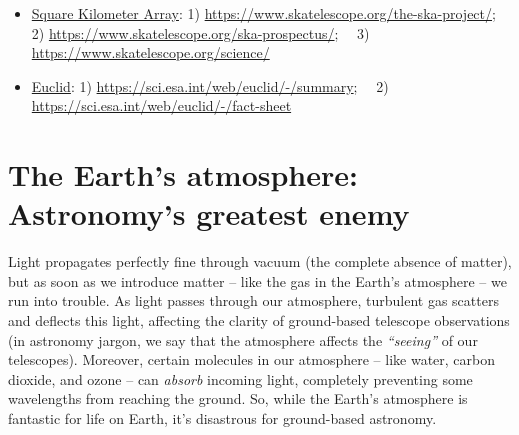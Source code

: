 \documentclass[11pt]{article}
\begin{document}
\begin{enumerate}
\begin{itemize}
        \item \underline{Square Kilometer Array}: 1) \url{https://www.skatelescope.org/the-ska-project/}; \, \, 2) \url{https://www.skatelescope.org/ska-prospectus/}; \, \, 3) \url{https://www.skatelescope.org/science/}
        
        \item \underline{Euclid}: 1) \url{https://sci.esa.int/web/euclid/-/summary}; \, \, 2) \url{https://sci.esa.int/web/euclid/-/fact-sheet}
    \end{itemize}
    
\end{enumerate}

\section{The Earth's atmosphere: Astronomy's greatest enemy}

Light propagates perfectly fine through vacuum (the complete absence of matter), but as soon as we introduce matter -- like the gas in the Earth's atmosphere -- we run into trouble. As light passes through our atmosphere, turbulent gas scatters and deflects this light, affecting the clarity of ground-based telescope observations (in astronomy jargon, we say that the atmosphere affects the \emph{``seeing''} of our telescopes). Moreover, certain molecules in our atmosphere -- like water, carbon dioxide, and ozone -- can \emph{absorb} incoming light, completely preventing some wavelengths from reaching the ground. So, while the Earth's atmosphere is fantastic for life on Earth, it's disastrous for ground-based astronomy.
\end{document}
